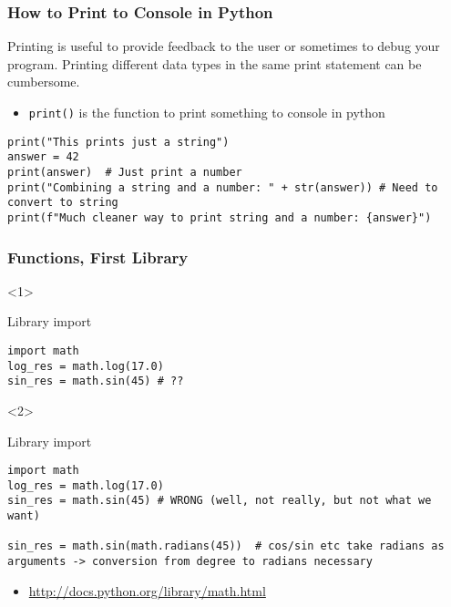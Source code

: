 \documentclass[10pt, a4paper]{beamer} %
\begin{document}
\begin{frame}[c, fragile]\frametitle{How to Print to Console in Python}
	Printing is useful to provide feedback to the user or sometimes to debug your program. Printing different data types
	in the same print statement can be cumbersome.
	\begin{itemize}
		\item \texttt{print()} is the function to print something to console in python
	\end{itemize}

	\begin{lstlisting}
print("This prints just a string")
answer = 42
print(answer)  # Just print a number
print("Combining a string and a number: " + str(answer)) # Need to convert to string
print(f"Much cleaner way to print string and a number: {answer}")
\end{lstlisting}
\end{frame}

\begin{frame}[t, fragile]\frametitle{Functions, First Library}
	\begin{onlyenv}
		\begin{block}{Library import}
			\begin{lstlisting}
import math
log_res = math.log(17.0)
sin_res = math.sin(45) # ??
  \end{lstlisting}
		\end{block}
	\end{onlyenv}

	\begin{onlyenv}
		\begin{block}{Library import}
			\begin{lstlisting}
import math
log_res = math.log(17.0)
sin_res = math.sin(45) # WRONG (well, not really, but not what we want)

sin_res = math.sin(math.radians(45))  # cos/sin etc take radians as arguments -> conversion from degree to radians necessary
  \end{lstlisting}
		\end{block}
	\end{onlyenv}

	\begin{itemize}
		\item \tiny \url{http://docs.python.org/library/math.html}
	\end{itemize}
\end{frame}



\end{document}
